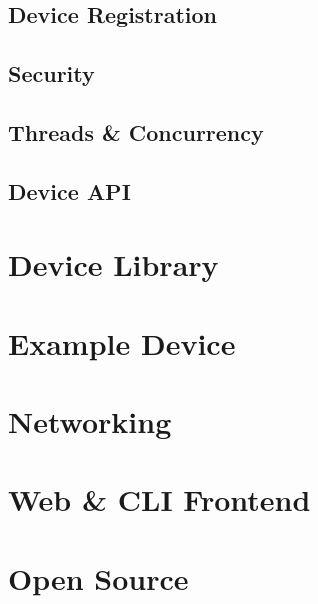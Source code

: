 \subsection{Device Registration} \label{sec:chap3:server:registration}


\subsection{Security} \label{sec:chap3:server:security}

\subsection{Threads \& Concurrency} \label{sec:chap3:server:threads}

\subsection{Device API} \label{sec:chap3:server:api}

\section{Device Library} \label{sec:chap3:devicelib}
\section{Example Device} \label{sec:chap3:deviceexample}
\section{Networking}

\section{Web \& CLI Frontend} \label{sec:chap3:frontend}
\section{Open Source} \label{sec:chap3:opensource}
